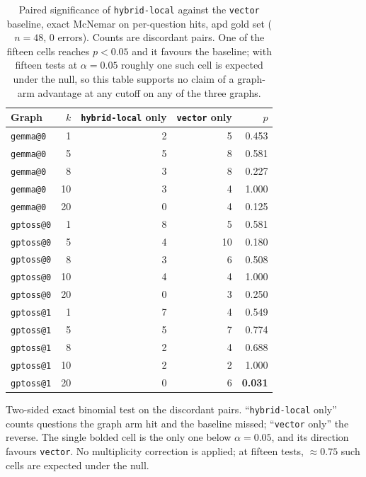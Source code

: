 \begin{table}[htbp]
  \centering
  \caption{Paired significance of \texttt{hybrid-local} against the \texttt{vector} baseline,
    exact McNemar on per-question hits, apd gold set ($n=48$, 0 errors). Counts are discordant
    pairs. One of the fifteen cells reaches $p<0.05$ and it favours the baseline; with fifteen
    tests at $\alpha=0.05$ roughly one such cell is expected under the null, so this table
    supports no claim of a graph-arm advantage at any cutoff on any of the three graphs.}
  \label{tab:retrieval-mcnemar}
  \begin{tabular}{lrrrr}
    \toprule
    Graph & $k$ & \texttt{hybrid-local} only & \texttt{vector} only & $p$ \\
    \midrule
    \texttt{gemma@0}  &  1 & 2 & 5 & 0.453 \\
    \texttt{gemma@0}  &  5 & 5 & 8 & 0.581 \\
    \texttt{gemma@0}  &  8 & 3 & 8 & 0.227 \\
    \texttt{gemma@0}  & 10 & 3 & 4 & 1.000 \\
    \texttt{gemma@0}  & 20 & 0 & 4 & 0.125 \\
    \midrule
    \texttt{gptoss@0} &  1 & 8 & 5 & 0.581 \\
    \texttt{gptoss@0} &  5 & 4 & 10 & 0.180 \\
    \texttt{gptoss@0} &  8 & 3 & 6 & 0.508 \\
    \texttt{gptoss@0} & 10 & 4 & 4 & 1.000 \\
    \texttt{gptoss@0} & 20 & 0 & 3 & 0.250 \\
    \midrule
    \texttt{gptoss@1} &  1 & 7 & 4 & 0.549 \\
    \texttt{gptoss@1} &  5 & 5 & 7 & 0.774 \\
    \texttt{gptoss@1} &  8 & 2 & 4 & 0.688 \\
    \texttt{gptoss@1} & 10 & 2 & 2 & 1.000 \\
    \texttt{gptoss@1} & 20 & 0 & 6 & \textbf{0.031} \\
    \bottomrule
  \end{tabular}

  \vspace{0.5em}
  \footnotesize
  Two-sided exact binomial test on the discordant pairs. ``\texttt{hybrid-local} only'' counts
  questions the graph arm hit and the baseline missed; ``\texttt{vector} only'' the reverse.
  The single bolded cell is the only one below $\alpha=0.05$, and its direction favours
  \texttt{vector}. No multiplicity correction is applied; at fifteen tests, $\approx0.75$ such
  cells are expected under the null.
\end{table}
